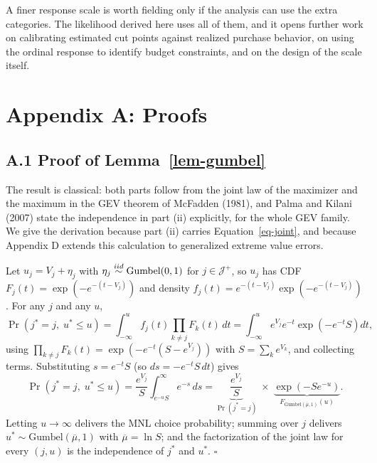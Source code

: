 \documentclass[
  letterpaper,
  DIV=11,
  numbers=noendperiod]{scrartcl}
\theoremstyle{plain}
\theoremstyle{plain}
\theoremstyle{plain}
\theoremstyle{remark}
\begin{document}
A finer response scale is worth fielding only if the analysis can use
the extra categories. The likelihood derived here uses all of them, and
it opens further work on calibrating estimated cut points against
realized purchase behavior, on using the ordinal response to identify
budget constraints, and on the design of the scale itself.

\section*{Appendix A: Proofs}\label{sec-appendix-proofs}

\subsection*{\texorpdfstring{A.1 Proof of
Lemma~\ref{lem-gumbel}}{A.1 Proof of Lemma~}}\label{a.1-proof-of-lem-gumbel}

The result is classical: both parts follow from the joint law of the
maximizer and the maximum in the GEV theorem of McFadden (1981), and
Palma and Kilani (2007) state the independence in part (ii) explicitly,
for the whole GEV family. We give the derivation because part (ii)
carries Equation~\ref{eq-joint}, and because Appendix D extends this
calculation to generalized extreme value errors.

Let \(u_j = V_j + \eta_j\) with \(\eta_j \stackrel{iid}{\sim} \text{Gumbel}(0,1)\) for
\(j \in \mathcal{J}^+\), so \(u_j\) has CDF
\(F_j(t) = \exp\left( -e^{-(t - V_j)} \right)\) and density
\(f_j(t) = e^{-(t-V_j)} \exp\left( -e^{-(t-V_j)} \right)\). For any
\(j\) and any \(u\), \[
\Pr \left( j^* = j, \; u^* \le u \right)
= \int_{-\infty}^{u} f_j(t) \prod_{k \ne j} F_k(t) \, dt
= \int_{-\infty}^{u} e^{V_j} e^{-t} \exp \left( -e^{-t} S \right) dt,
\] using
\(\prod_{k \ne j} F_k(t) = \exp\left( -e^{-t} \left( S - e^{V_j} \right) \right)\)
with \(S = \sum_{k} e^{V_k}\), and collecting terms. Substituting
\(s = e^{-t} S\) (so \(ds = -e^{-t} S \, dt\)) gives \[
\Pr \left( j^* = j, \; u^* \le u \right)
= \frac{e^{V_j}}{S} \int_{e^{-u} S}^{\infty} e^{-s} \, ds
= \underbrace{\frac{e^{V_j}}{S}}_{\Pr\left(j^*=j\right)} \; \times \; \underbrace{\exp \left( -S e^{-u} \right)}_{F_{\text{Gumbel}\left(\overline{\mu},1\right)}(u)}.
\] Letting \(u \to \infty\) delivers the MNL choice probability; summing
over \(j\) delivers \(u^* \sim \text{Gumbel}(\overline{\mu}, 1)\) with
\(\overline{\mu} = \ln S\); and the factorization of the joint law for
every \((j, u)\) is the independence of \(j^*\) and \(u^*\). \(\square\)
\end{document}

